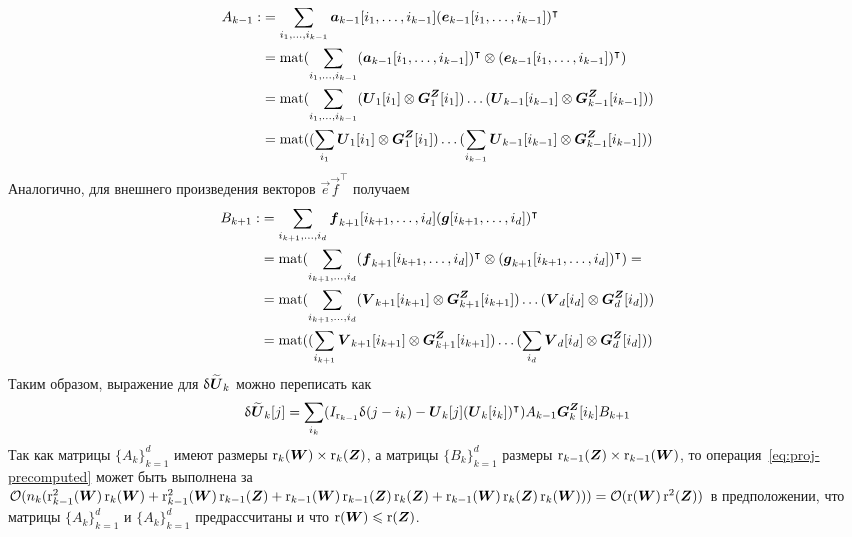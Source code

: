 \begin{equation}
\begin{aligned}
\label{eq:projection-Ak}
A_{k-1} :&= \sum_{i_1, \ldots, i_{k-1}}\boldsymbol{a}_{k-1}[i_1, \ldots, i_{k-1}] (\boldsymbol{e}_{k-1}[i_1, \ldots, i_{k-1}])^\intercal \\
&= \text{mat}(\sum_{i_1, \ldots, i_{k-1}}(\boldsymbol{a}_{k-1}[i_1, \ldots, i_{k-1}])^\intercal \otimes (\boldsymbol{e}_{k-1}[i_1, \ldots, i_{k-1}])^\intercal) \\
&= \text{mat}(\sum_{i_1, \ldots, i_{k-1}}(\boldsymbol{U}_1[i_1] \otimes \boldsymbol{G}_1^{\boldsymbol{Z}}[i_1]) \ldots (\boldsymbol{U}_{k-1}[i_{k-1}] \otimes \boldsymbol{G}_{k-1}^{\boldsymbol{Z}}[i_{k-1}]))\\
&= \text{mat}((\sum_{i_1}\boldsymbol{U}_1[i_1] \otimes \boldsymbol{G}_1^{\boldsymbol{Z}}[i_1]) \ldots (\sum_{i_{k-1}}\boldsymbol{U}_{k-1}[i_{k-1}] \otimes \boldsymbol{G}_{k-1}^{\boldsymbol{Z}}[i_{k-1}]))
\end{aligned}
\end{equation}
Аналогично, для внешнего произведения векторов $\vec{e} \vec{f}^\intercal$ получаем
\begin{equation*}
\begin{aligned}
B_{k+1} :&= \sum_{i_{k+1}, \ldots, i_d}\boldsymbol{f}_{k+1}[i_{k+1}, \ldots, i_{d}] (\boldsymbol{g}[i_{k+1}, \ldots, i_{d}])^\intercal\\
&= \text{mat}(\sum_{i_{k+1}, \ldots, i_d}(\boldsymbol{f}_{k+1}[i_{k+1}, \ldots, i_{d}])^\intercal \otimes (\boldsymbol{g}_{k+1}[i_{k+1}, \ldots, i_{d}])^\intercal) = \\
&= \text{mat}(\sum_{i_{k+1}, \ldots, i_d}(\boldsymbol{V}_{k+1}[i_{k+1}] \otimes \boldsymbol{G}_{k+1}^{\boldsymbol{Z}}[i_{k+1}]) \ldots (\boldsymbol{V}_{d}[i_{d}] \otimes \boldsymbol{G}_{d}^{\boldsymbol{Z}}[i_{d}]))\\
&=\text{mat}((\sum_{i_{k+1}}\boldsymbol{V}_{k+1}[i_{k+1}] \otimes \boldsymbol{G}_{k+1}^{\boldsymbol{Z}}[i_{k+1}]) \ldots (\sum_{i_{d}}\boldsymbol{V}_{d}[i_{d}] \otimes \boldsymbol{G}_{d}^{\boldsymbol{Z}}[i_{d}]))\\
\end{aligned}
\end{equation*}
Таким образом, выражение для $\updelta \widetilde{\boldsymbol{U}}_k$ можно переписать как
\begin{equation}
\begin{aligned}
\label{eq:proj-precomputed}
\updelta \widetilde{\boldsymbol{U}}_k[j] = \sum_{i_k}(I_{\operatorname{r}_{k-1}}\updelta(j - i_k) - \boldsymbol{U}_k[j] (\boldsymbol{U}_k[i_k])^\intercal) A_{k-1} \boldsymbol{G}_{k}^{\boldsymbol{Z}}[i_k] B_{k+1}
\end{aligned}
\end{equation}
Так как матрицы $\{A_k\}_{k=1}^d$ имеют размеры $\operatorname{r}_{k}(\boldsymbol{W}) \times \operatorname{r}_{k}(\boldsymbol{Z})$, а матрицы $\{B_k\}_{k=1}^d$ размеры $\operatorname{r}_{k-1}(\boldsymbol{Z}) \times \operatorname{r}_{k-1}(\boldsymbol{W})$, то операция~\eqref{eq:proj-precomputed} может быть выполнена за $\mathcal{O}(n_k (\operatorname{r}^2_{k-1}(\boldsymbol{W})\operatorname{r}_{k}(\boldsymbol{W}) + \operatorname{r}^2_{k-1}(\boldsymbol{W}) \operatorname{r}_{k-1}(\boldsymbol{Z}) + \operatorname{r}_{k-1}(\boldsymbol{W})\operatorname{r}_{k-1}(\boldsymbol{Z})\operatorname{r}_{k}(\boldsymbol{Z}) + \operatorname{r}_{k-1}(\boldsymbol{W}) \operatorname{r}_{k}(\boldsymbol{Z}) \operatorname{r}_{k}(\boldsymbol{W}))) = \mathcal{O}(\operatorname{r}(\boldsymbol{W}) \operatorname{r}^2(\boldsymbol{Z}))$ в предположении, что матрицы $\{A_k\}_{k=1}^d$ и $\{A_k\}_{k=1}^d$ предрассчитаны и что $\operatorname{r}(\boldsymbol{W}) \leqslant \operatorname{r}(\boldsymbol{Z})$.

